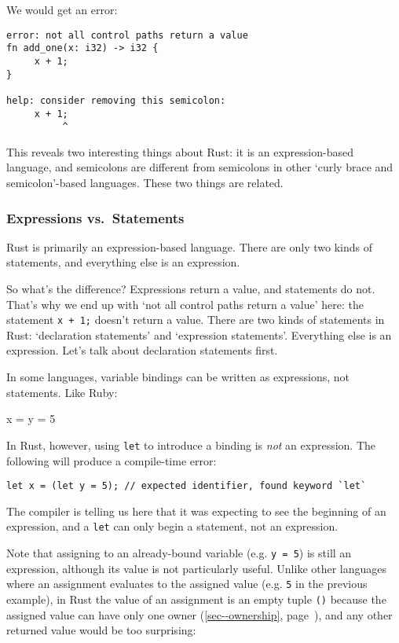 \documentclass[a4paper,]{book}
\renewcommand*{\hyperref}[2][\ar]{%
  \def\ar{#2}%
  #2 (\autoref{#1}, page~\pageref{#1})}
\newenvironment{Shaded}{\begin{snugshade}}{\end{snugshade}}
\newcommand{\DecValTok}[1]{\textcolor[rgb]{0.00,0.00,0.81}{{#1}}}
\newcommand{\NormalTok}[1]{{#1}}
\begin{document}
We would get an error:

\begin{verbatim}
error: not all control paths return a value
fn add_one(x: i32) -> i32 {
     x + 1;
}

help: consider removing this semicolon:
     x + 1;
          ^
\end{verbatim}

This reveals two interesting things about Rust: it is an
expression-based language, and semicolons are different from semicolons
in other `curly brace and semicolon'-based languages. These two things
are related.

\subsubsection{Expressions
vs.~Statements}\label{expressions-vs.statements}

Rust is primarily an expression-based language. There are only two kinds
of statements, and everything else is an expression.

So what's the difference? Expressions return a value, and statements do
not. That's why we end up with `not all control paths return a value'
here: the statement \texttt{x\ +\ 1;} doesn't return a value. There are
two kinds of statements in Rust: `declaration statements' and
`expression statements'. Everything else is an expression. Let's talk
about declaration statements first.

In some languages, variable bindings can be written as expressions, not
statements. Like Ruby:

\begin{Shaded}
\begin{Highlighting}[]
\NormalTok{x = y = }\DecValTok{5}
\end{Highlighting}
\end{Shaded}

In Rust, however, using \texttt{let} to introduce a binding is
\emph{not} an expression. The following will produce a compile-time
error:

\begin{verbatim}
let x = (let y = 5); // expected identifier, found keyword `let`
\end{verbatim}

The compiler is telling us here that it was expecting to see the
beginning of an expression, and a \texttt{let} can only begin a
statement, not an expression.

Note that assigning to an already-bound variable (e.g. \texttt{y\ =\ 5})
is still an expression, although its value is not particularly useful.
Unlike other languages where an assignment evaluates to the assigned
value (e.g. \texttt{5} in the previous example), in Rust the value of an
assignment is an empty tuple \texttt{()} because the assigned value can
have \hyperref[sec--ownership]{only one owner}, and any other returned
value would be too surprising:
\end{document}
